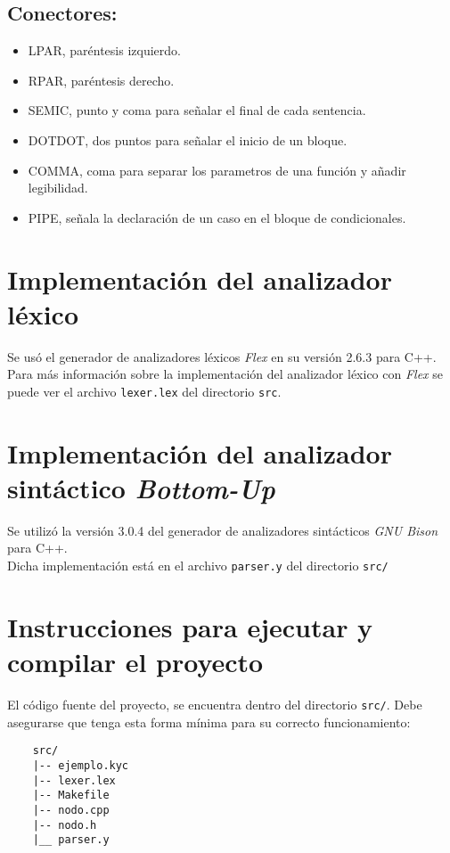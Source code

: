 \documentclass[12pt]{article}
\begin{document}
    \subsection{Conectores:}
    \begin{itemize}
 	\item LPAR, paréntesis izquierdo.
    \item RPAR, paréntesis derecho.
    \item SEMIC, punto y coma para señalar el final de cada sentencia.
    \item DOTDOT, dos puntos para señalar el inicio de un bloque.
    \item COMMA, coma para separar los parametros de una función y añadir legibilidad.
    \item PIPE, señala la declaración de un caso en el bloque de condicionales.
\end{itemize}


\section{Implementación del analizador léxico}
Se usó el generador de analizadores léxicos \textit{Flex} en su versión 2.6.3 para C++. \\
Para más información sobre la implementación del analizador léxico con \textit{Flex} se puede ver el archivo \texttt{lexer.lex} del directorio \texttt{src}.\\
\section{Implementación del analizador sintáctico \textit{Bottom-Up}}
Se utilizó la versión 3.0.4 del generador de analizadores sintácticos \textit{GNU Bison} para C++. \\
Dicha implementación está en el archivo \texttt{parser.y} del directorio \texttt{src/}



\section{Instrucciones para ejecutar y compilar el proyecto}\label{sec:s}

El código fuente del proyecto, se encuentra dentro del directorio \texttt{src/}. Debe asegurarse
que tenga esta forma mínima para su correcto funcionamiento:
\begin{verbatim}
    src/
    |-- ejemplo.kyc
    |-- lexer.lex
    |-- Makefile
    |-- nodo.cpp
    |-- nodo.h
    |__ parser.y

\end{verbatim}
\end{document}
